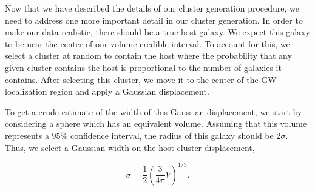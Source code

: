 Now that we have described the details of our cluster generation procedure, we need to address one more important detail in our cluster generation. In order to make our data realistic, there should be a true host galaxy. We expect this galaxy to be near the center of our volume credible interval. To account for this, we select a cluster at random to contain the host where the probability that any given cluster contains the host is proportional to the number of galaxies it contains. After selecting this cluster, we move it to the center of the GW localization region and apply a Gaussian displacement.

To get a crude estimate of the width of this Gaussian displacement, we start by considering a sphere which has an equivalent volume. Assuming that this volume represents a $95\%$ confidence interval, the radius of this galaxy should be $2\sigma$. Thus, we select a Gaussian width on the host cluster displacement,

\begin{equation}
  \sigma = \frac{1}{2}\left(\frac{3}{4\pi} V\right)^{1/3}.
\end{equation}
